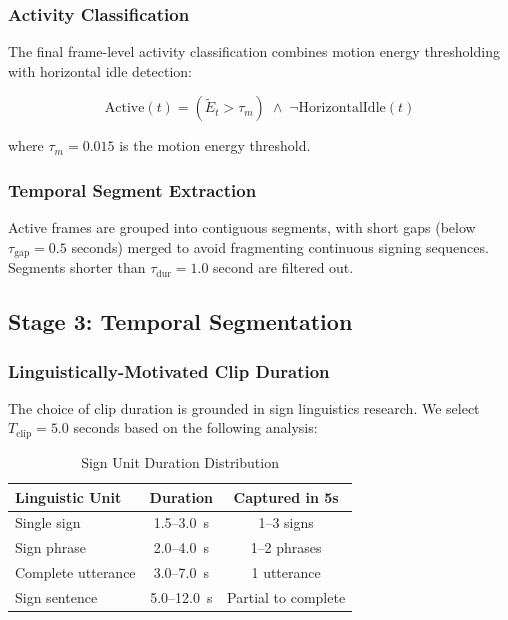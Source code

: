 \documentclass[journal]{IEEEtran}
\begin{document}
\subsubsection{Activity Classification}

The final frame-level activity classification combines motion energy thresholding with horizontal idle detection:

\begin{equation}
\text{Active}(t) = \left(\tilde{E}_t > \tau_m\right) \;\wedge\; \neg \text{HorizontalIdle}(t)
\label{eq:activity}
\end{equation}

where $\tau_m = 0.015$ is the motion energy threshold.

\subsubsection{Temporal Segment Extraction}

Active frames are grouped into contiguous segments, with short gaps (below $\tau_{\text{gap}} = 0.5$ seconds) merged to avoid fragmenting continuous signing sequences. Segments shorter than $\tau_{\text{dur}} = 1.0$ second are filtered out.

\subsection{Stage 3: Temporal Segmentation}

\subsubsection{Linguistically-Motivated Clip Duration}

The choice of clip duration is grounded in sign linguistics research. We select $T_{\text{clip}} = 5.0$ seconds based on the following analysis:

\begin{table}[htbp]
\centering
\caption{Sign Unit Duration Distribution}
\label{tab:sign_duration}
\begin{tabular}{@{}lcc@{}}
\toprule
\textbf{Linguistic Unit} & \textbf{Duration} & \textbf{Captured in 5s} \\ \midrule
Single sign & 1.5--3.0~s & 1--3 signs \\
Sign phrase & 2.0--4.0~s & 1--2 phrases \\
Complete utterance & 3.0--7.0~s & 1 utterance \\
Sign sentence & 5.0--12.0~s & Partial to complete \\
\bottomrule
\end{tabular}
\end{table}
\end{document}
